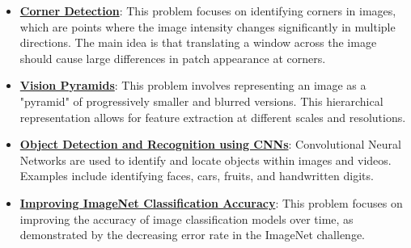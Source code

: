 \documentclass{article}%
\begin{document}
\begin{itemize}[leftmargin=*]
\item \href{https://purdue.brightspace.com/d2l/common/assets/pdfjs-d2l-dist/1.0.14-legacy/web/viewer.html?file=%2Fcontent%2Fenforced%2F1095467-wl.202510.CS.24300.001%2F08L2-Feature Extraction.pdf%3Fou%3D1095467&lang=en-us&container=d2l-fileviewer-rendered-pdf&fullscreen=d2l-fileviewer-rendered-pdf-dialog&height=667#page=20}{\textbf{Corner Detection}}: This problem focuses on identifying corners in images, which are points where the image intensity changes significantly in multiple directions. The main idea is that translating a window across the image should cause large differences in patch appearance at corners.%
\item \href{https://purdue.brightspace.com/d2l/common/assets/pdfjs-d2l-dist/1.0.14-legacy/web/viewer.html?file=%2Fcontent%2Fenforced%2F1095467-wl.202510.CS.24300.001%2F08L2-Feature Extraction.pdf%3Fou%3D1095467&lang=en-us&container=d2l-fileviewer-rendered-pdf&fullscreen=d2l-fileviewer-rendered-pdf-dialog&height=667#page=30}{\textbf{Vision Pyramids}}: This problem involves representing an image as a "pyramid" of progressively smaller and blurred versions. This hierarchical representation allows for feature extraction at different scales and resolutions.%
\item \href{https://purdue.brightspace.com/d2l/common/assets/pdfjs-d2l-dist/1.0.14-legacy/web/viewer.html?file=%2Fcontent%2Fenforced%2F1095467-wl.202510.CS.24300.001%2F09L1-cnn.pdf%3Fou%3D1095467&lang=en-us&container=d2l-fileviewer-rendered-pdf&fullscreen=d2l-fileviewer-rendered-pdf-dialog&height=667#page=2}{\textbf{Object Detection and Recognition using CNNs}}: Convolutional Neural Networks are used to identify and locate objects within images and videos. Examples include identifying faces, cars, fruits, and handwritten digits.%
\item \href{https://purdue.brightspace.com/d2l/common/assets/pdfjs-d2l-dist/1.0.14-legacy/web/viewer.html?file=%2Fcontent%2Fenforced%2F1095467-wl.202510.CS.24300.001%2F09L1-cnn.pdf%3Fou%3D1095467&lang=en-us&container=d2l-fileviewer-rendered-pdf&fullscreen=d2l-fileviewer-rendered-pdf-dialog&height=667#page=3}{\textbf{Improving ImageNet Classification Accuracy}}: This problem focuses on improving the accuracy of image classification models over time, as demonstrated by the decreasing error rate in the ImageNet challenge.%
\end{itemize}

%
\end{document}
